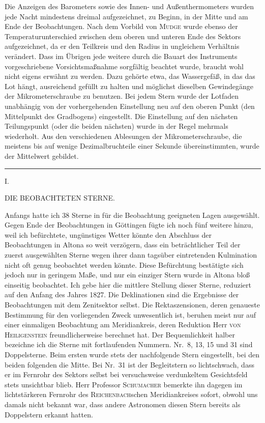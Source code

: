 Die Anzeigen des Barometers sowie des Innen- und Außenthermometers wurden jede Nacht
mindestens dreimal aufgezeichnet, zu Beginn, in der Mitte und am Ende der Beobachtungen.
Nach dem Vorbild von \textsc{Mudge} wurde ebenso der Temperaturunterschied zwischen dem
oberen und unteren Ende des Sektors aufgezeichnet, da er den Teilkreis und den Radius
in ungleichem Verhältnis verändert. Dass im Übrigen jede weitere durch die Bauart des
Instruments vorgeschriebene Vorsichtsmaßnahme sorgfältig beachtet wurde, braucht wohl
nicht eigens erwähnt zu werden. Dazu gehörte etwa, das Wassergefäß, in das das Lot hängt,
ausreichend gefüllt zu halten und möglichst dieselben Gewindegänge der Mikrometerschraube
zu benutzen. Bei jedem Stern wurde der Lotfaden unabhängig von der vorhergehenden Einstellung
neu auf den oberen Punkt (den Mittelpunkt des Gradbogens) eingestellt. Die Einstellung
auf den nächsten Teilungspunkt (oder die beiden nächsten) wurde in der Regel mehrmals
wiederholt. Aus den verschiedenen Ablesungen der Mikrometerschraube, die meistens bis auf
wenige Dezimalbruchteile einer Sekunde übereinstimmten, wurde der Mittelwert gebildet.

\begin{center}\rule{.24\textwidth}{.4pt}\end{center}

\clearpage
\vspace*{18mm}
\begin{center}
{\large I.}\par\medskip
{\Large DIE BEOBACHTETEN STERNE.}
\end{center}

Anfangs hatte ich 38 Sterne in für die Beobachtung geeigneten Lagen ausgewählt.
Gegen Ende der Beobachtungen in Göttingen fügte ich noch fünf weitere hinzu, weil ich
befürchtete, ungünstiges Wetter könnte den Abschluss der Beobachtungen in Altona so weit
verzögern, dass ein beträchtlicher Teil der zuerst ausgewählten Sterne wegen ihrer dann
tagsüber eintretenden Kulmination nicht oft genug beobachtet werden könnte. Diese Befürchtung
bestätigte sich jedoch nur in geringem Maße, und nur ein einziger Stern wurde in Altona bloß
einseitig beobachtet. Ich gebe hier die mittlere Stellung dieser Sterne, reduziert auf den
Anfang des Jahres 1827. Die Deklinationen sind die Ergebnisse der Beobachtungen mit dem
Zenitsektor selbst. Die Rektaszensionen, deren genaueste Bestimmung für den vorliegenden
Zweck unwesentlich ist, beruhen meist nur auf einer einmaligen Beobachtung am Meridiankreis,
deren Reduktion Herr \textsc{von Heiligenstein} freundlicherweise berechnet hat.
Der Bequemlichkeit halber bezeichne ich die Sterne mit fortlaufenden Nummern. Nr.\ 8, 13, 15
und 31 sind Doppelsterne. Beim ersten wurde stets der nachfolgende Stern eingestellt, bei
den beiden folgenden die Mitte. Bei Nr.\ 31 ist der Begleitstern so lichtschwach, dass er
im Fernrohr des Sektors selbst bei versuchsweise verdunkeltem Gesichtsfeld stets unsichtbar
blieb. Herr Professor \textsc{Schumacher} bemerkte ihn dagegen im lichtstärkeren Fernrohr
des \textsc{Reichenbach}schen Meridiankreises sofort, obwohl uns damals nicht bekannt war,
dass andere Astronomen diesen Stern bereits als Doppelstern erkannt hatten.


